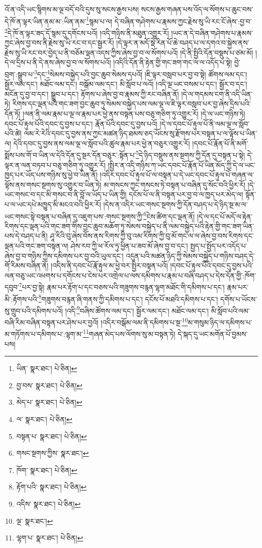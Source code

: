 འོ་ན་འདི་ཡང་སྙིགས་མ་ལྔ་བདོ་བའི་དུས་སུ་སངས་རྒྱས་པས། སངས་རྒྱས་གཞན་པས་འོད་ལ་སོགས་པ་ཆུང་བས་དེ་ཁོ་ན་ལྟར་ཡིན་ནམ་མ་:ཡིན་ནམ་\footnote{ཡིན་  སྣར་ཐང་།  པེ་ཅིན། }སྙམ་པ་ལ། དེ་བཞིན་གཤེགས་པ་རྣམས་ཀྱང་རྗེས་སུ་ཡི་རང་ངོ་ཞེས་:བྱ་བ་\footnote{བྱ་བས་  སྣར་ཐང་།  པེ་ཅིན། }དེ་ཁོ་ན་ལྟར་ཟད་དོ་སྙམ་དུ་དགོངས་པའོ། །འདི་གཉིས་ནི་མཐུན་འགྱུར་རོ། །ཡང་ན་དེ་བཞིན་གཤེགས་པ་རྣམས་ཀྱང་ཞེས་བྱ་བས་ནི་རྗེས་སུ་ཡི་རང་བ་དང་སྦྱར་རོ། །དེ་ལྟར་ན་མདོ་སྡེ་རིན་པོ་ཆེ་བཤད་པ་ལ་དགའ་བ་སྐྱེས་ནས་རྗེས་སུ་ཡི་རང་བར་བྱེད་པ་ནི་བཅོམ་ལྡན་འདས་ཀྱིས་ཞེས་བྱ་བ་ལ་སོགས་པའོ། །དེ་ནི་སྤྱིའི་དོན་བསྡུས་པ་ཙམ་མོ། །དེ་ལ་དྲིས་པ་ནི་དེ་ནས་ཞེས་བྱ་བ་ལ་སོགས་པའོ། །འདིའི་དོན་ནི་རྟེན་གྱི་གང་ཟག་གང་ལ་ལ་འདོད་པ་སྟེ། བྱེ་བྲག་:སྒྲུབ་པ་\footnote{མེད་པ་  སྣར་ཐང་།  པེ་ཅིན། }དང་\footnote{ལ་  སྣར་ཐང་།  པེ་ཅིན། }སེམས་བསྐྱེད་པའི་བྱང་ཆུབ་སེམས་དཔའོ། །ཇི་ལྟར་བསླབ་པར་བྱ་བ་སྟེ། ཚོགས་ལམ་དང་། སྦྱོར་ལམ་དང་། མཐོང་ལམ་དང་། བསྒོམ་ལམ་དང་། མི་སློབ་པ་ལའོ། །འདི་ལྔ་ཡང་བསམ་པ་དང་། སྦྱོར་བ་དང་། མངོན་དུ་བྱ་བ་དང་། སྒྲུབ་པ་དང་། རྟོགས་པ་ཞེས་བྱ་བ་རྣམས་ཀྱི་རང་བཞིན་ནོ། །དེ་ལ་གདམས་ངག་ནི་འདི་ཡིན་ཏེ། རིགས་དང་ལྡན་པའི་གང་ཟག་བྱང་ཆུབ་ཏུ་སེམས་བསྐྱེད་པས་ལམ་ལྔ་ལ་ཇི་ལྟར་བསླབ་པར་བྱ་ཞེས་དྲིས་པའི་དོན་ཏོ། །ལན་ནི་ལམ་རྣམ་པ་ལྔ་ལ་རྣམ་པར་ཕྱེ་ནས་བསྟན་པས་བཅུ་གཅིག་ཏུ་འགྱུར་རོ། །དེ་ལ་ཡང་གཉིས་ཏེ། དབང་པོ་རྟུལ་པོའི་དབང་དུ་བྱས་པ་དང་། རྣོན་པོའི་དབང་དུ་བྱས་པའོ། །དེ་ལ་དབང་པོ་རྟུལ་པོ་ནི་ལམ་ལྔ་ལ་སློབ་པའི་ཚེ། ལམ་རེ་རེའི་དབང་དུ་བྱས་ནས་ཀྱང་མཚན་ཉིད་ཐམས་ཅད་ཡོངས་སུ་རྫོགས་པར་བསྟན་པ་ལ་ལྟོས་པ་ཡིན་ལ། དེའི་དབང་དུ་བྱས་ནས་ལམ་ལྔ་ལ་སློབ་པའི་ཚུལ་རྣམ་པར་ཕྱེ་ན་བཅུར་འགྱུར་རོ། །དབང་པོ་རྣོན་པོ་ནི་མགོ་སྨོས་པས་གོ་བ་ཡིན་ལ་དེའི་དོན་དུ་སྔར་དོན་བཅུར་:སྟོན་པ་\footnote{བསྟན་པ་  སྣར་ཐང་།  པེ་ཅིན། }དེ་ཉིད་བསྡུས་ནས་སྔགས་ཀྱི་དོན་དུ་བསྟན་པ་སྟེ། དེ་ལྟར་ན་ལན་བཏབ་པ་བཅུ་གཅིག་ཏུ་འགྱུར་རོ། །སྤྱིར་ན་འདི་གཉིས་ཀ་ཡང་དབང་པོ་རྣོན་པོ་ཡིན་མོད་ཀྱི་དེ་ལ་ཡང་ཁྱད་པར་ཡོད་པས་གཉིས་སུ་ཕྱེ་བ་ཡིན་ནོ། །འདིར་དབང་པོ་རྟུལ་པོ་ལ་བསྟན་པ་དེ་ཡང་དབང་པོ་རྟུལ་པོ་གཞན་ལ་ལྟོས་ནས་གསང་སྔགས་སུ་འགྱུར་བ་ཡིན་ཏེ། མ་གསངས་ཀྱང་གསངས་ཏེ་བསྟན་པ་བཞིན་དུ་སོང་བའི་ཕྱིར་རོ། །དེ་ཡང་གསང་བ་དང་མི་གསང་བ་ནི་བློ་ལ་ཡོད་པ་ཡིན་གྱི། དངོས་པོ་ལ་ནི་བསྟན་པར་བྱ་བ་ལ་ཁྱད་པར་མེད་ལ། སྟོན་པ་ལ་ཡང་དཔེ་མཁྱུད་མི་མངའ་བའི་ཕྱིར་རོ། །དེས་ན་འདིར་ཡང་གསང་སྔགས་ཀྱི་དོན་བཤད་པ་དེ་ཉིད་སྔ་མ་ལ་ཡང་གསང་སྟེ་བསྟན་པ་བཞིན་དུ་འཇུག་པས་:གསང་སྔགས་ཀྱི་\footnote{གསང་སྔགས་ཀྱིས་  སྣར་ཐང་། }ངེས་ཚིག་དང་ལྡན་ནོ། །དེ་ལ་དང་པོ་མདོ་ལ་རྟེན་རིགས་དང་ལྡན་པའི་གང་ཟག་གིས་བྱང་ཆུབ་མཆོག་ཏུ་སེམས་བསྐྱེད་པ་ནི་ལམ་བསྐྱེད་པའི་རྟེན་གྱི་གང་ཟག་ཡིན་པས་དེ་བཤད་པ་ནི། ཤཱ་རིའི་བུ་ཞེས་བོས་ནས་རིགས་ཀྱི་བུ་འམ་རིགས་ཀྱི་བུ་མོ་གང་ལ་ལ་ཞེས་བྱ་བས་རིགས་དང་ལྡན་པའི་གང་ཟག་བསྟན་ལ། ཤེས་རབ་ཀྱི་ཕ་རོལ་ཏུ་ཕྱིན་པ་ཟབ་མོ་ཞེས་བྱ་བ་དང་། སྤྱད་པ་སྤྱོད་པར་འདོད་པ་ཞེས་བྱ་བ་གཉིས་ཀྱིས་དམིགས་པར་བྱ་བའི་ཡུལ་དང་། འདུན་པའི་མཚན་ཉིད་ཀྱི་སེམས་བསྐྱེད་པ་གཉིས་བཤད་དེ་གོ་རིམས་བཞིན་ནོ། །འདིས་ནི་དབང་པོ་རྣོ་རྟུལ་མ་ཕྱེ་བར་སྤྱིར་བསྟན་པའོ། །དབང་པོ་རྟུལ་པོའི་དབང་དུ་བྱས་པའི་ལན་བཅུ་ཡང་འཕགས་པ་དགོངས་པ་ངེས་པར་འགྲེལ་པ་ལས་དམིགས་པ་རྣམ་པ་བཞི་བཤད་པ་དེས་དོན་གྱི་:ཁོག་དབུབ་\footnote{ཁོག་  སྣར་ཐང་།  པེ་ཅིན། }པར་བྱ་སྟེ། རྣམ་པར་རྟོག་པ་དང་བཅས་པའི་གཟུགས་བརྙན་ལྷག་མཐོང་གི་དམིགས་པ་དང་། རྣམ་པར་མི་:རྟོགས་པའི་\footnote{རྟོག་པའི་  སྣར་ཐང་།  པེ་ཅིན། }གཟུགས་བརྙན་ཞི་གནས་ཀྱི་དམིགས་པ་དང་། དངོས་པོ་མཐའི་དམིགས་པ་དང་། དགོས་པ་ཡོངས་སུ་གྲུབ་པའི་དམིགས་པའོ། །འདི་\footnote{འདིས་  སྣར་ཐང་།  པེ་ཅིན། }བཞིས་ཚོགས་ལམ་དང་། སྦྱོར་ལམ་དང་། མཐོང་ལམ་དང་། མི་སློབ་པའི་ལམ་བཞི་རིམ་བཞིན་བསྟན་པར་ཤེས་པར་བྱའོ། །འདིར་བསྒོམ་ལམ་ནི་དམིགས་པ་སྔ་\footnote{ལྔ་  སྣར་ཐང་། }མ་གསུམ་ཉིད་ལ་དམིགས་པ་མ་གཏོགས་པ་དམིགས་པ་:ལྷག་མ་\footnote{ལྷག་པ་  སྣར་ཐང་།  པེ་ཅིན། }གཞན་མེད་པས་ལོགས་སུ་མ་བསྟན་ཏེ། དེ་སྐད་དུ་ཡང་མགོན་པོ་བྱམས་པས། 